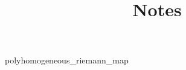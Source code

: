 \documentclass{article}
\title{Notes}
\begin{document}



{polyhomogeneous_riemann_map}



%
\end{document}
